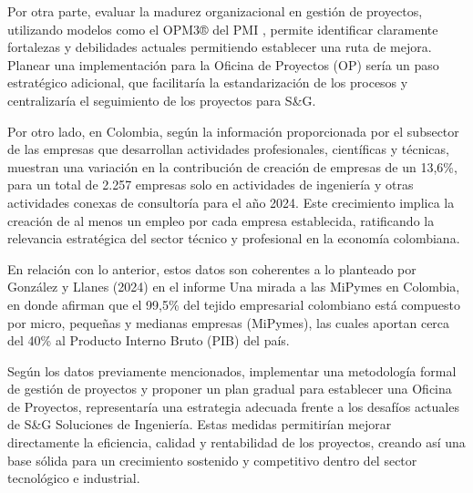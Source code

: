 Por otra parte, evaluar la madurez organizacional en gestión de proyectos, utilizando modelos como el OPM3® del PMI \parencite{PMIStandardOrganizationalProject2018}, permite identificar claramente fortalezas y debilidades actuales permitiendo establecer una ruta de mejora. Planear una implementación para la Oficina de Proyectos (OP) sería un paso estratégico adicional, que facilitaría la estandarización de los procesos y centralizaría el seguimiento de los proyectos para S\&G.

Por otro lado, en Colombia, según la información proporcionada por \parencite[p. 8]{confecamarasDinamicaCreacionEmpresas2025} el subsector de las empresas que desarrollan actividades profesionales, científicas y técnicas, muestran una variación en la contribución de creación de empresas de un 13,6\%, para un total de 2.257 empresas solo en actividades de ingeniería y otras actividades conexas de consultoría para el año 2024. Este crecimiento implica la creación de al menos un empleo por cada empresa establecida, ratificando la relevancia estratégica del sector técnico y profesional en la economía colombiana.

En relación con lo anterior, estos datos son coherentes a lo planteado por González y Llanes (2024) en el informe Una mirada a las MiPymes en Colombia, en donde afirman que el 99,5\% del tejido empresarial colombiano está compuesto por micro, pequeñas y medianas empresas (MiPymes), las cuales aportan cerca del 40\% al Producto Interno Bruto (PIB) del país.

Según los datos previamente mencionados, implementar una metodología formal de gestión de proyectos y proponer un plan gradual para establecer una Oficina de Proyectos, representaría una estrategia adecuada frente a los desafíos actuales de S\&G Soluciones de Ingeniería. Estas medidas permitirían mejorar directamente la eficiencia, calidad y rentabilidad de los proyectos, creando así una base sólida para un crecimiento sostenido y competitivo dentro del sector tecnológico e industrial. 
